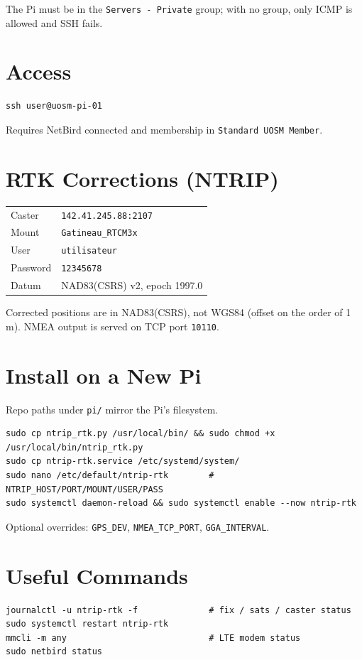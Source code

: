 \documentclass{article}
\begin{document}
\medskip
The Pi must be in the \texttt{Servers - Private} group; with no group, only ICMP is allowed and SSH fails.

\section{Access}
\begin{verbatim}
ssh user@uosm-pi-01
\end{verbatim}
Requires NetBird connected and membership in \texttt{Standard UOSM Member}.

\section{RTK Corrections (NTRIP)}
\begin{tabular}{@{}ll@{}}
\toprule
Caster    & \texttt{142.41.245.88:2107} \\
Mount     & \texttt{Gatineau\_RTCM3x} \\
User      & \texttt{utilisateur} \\
Password  & \texttt{12345678} \\
Datum     & NAD83(CSRS) v2, epoch 1997.0 \\
\bottomrule
\end{tabular}

\medskip
Corrected positions are in NAD83(CSRS), not WGS84 (offset on the order of 1\,m).
NMEA output is served on TCP port \texttt{10110}.

\section{Install on a New Pi}
Repo paths under \texttt{pi/} mirror the Pi's filesystem.
\begin{verbatim}
sudo cp ntrip_rtk.py /usr/local/bin/ && sudo chmod +x /usr/local/bin/ntrip_rtk.py
sudo cp ntrip-rtk.service /etc/systemd/system/
sudo nano /etc/default/ntrip-rtk        # NTRIP_HOST/PORT/MOUNT/USER/PASS
sudo systemctl daemon-reload && sudo systemctl enable --now ntrip-rtk
\end{verbatim}
Optional overrides: \texttt{GPS\_DEV}, \texttt{NMEA\_TCP\_PORT}, \texttt{GGA\_INTERVAL}.

\section{Useful Commands}
\begin{verbatim}
journalctl -u ntrip-rtk -f              # fix / sats / caster status
sudo systemctl restart ntrip-rtk
mmcli -m any                            # LTE modem status
sudo netbird status
\end{verbatim}
\end{document}
